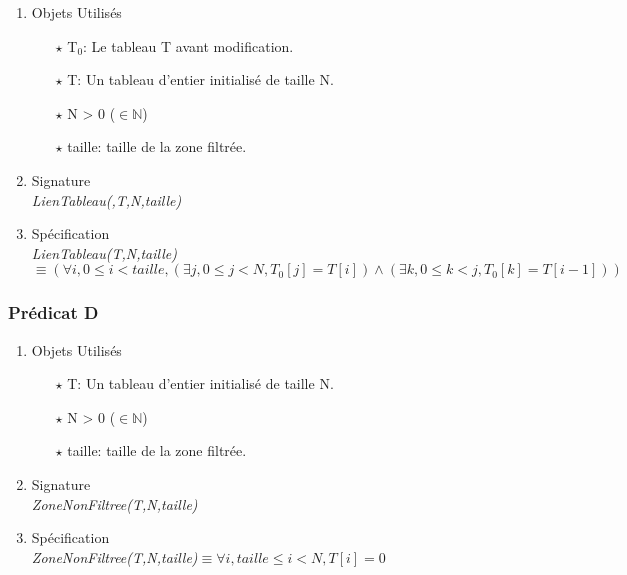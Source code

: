 \documentclass[a4paper, 11pt, oneside]{article}
\begin{document}
        \begin{enumerate}
            \item Objets Utilisés
                \begin{itemize}
                    \item[$\star$] T$_0$: Le tableau T avant modification.
                    \item[$\star$] T: Un tableau d'entier initialisé de taille N.
                    \item[$\star$] N > 0 ($\in \mathbb{N}$)
                    \item[$\star$] taille: taille de la zone filtrée. 
                \end{itemize}

            \item Signature \\
                \textit{LienTableau(,T,N,taille)}

            \item Spécification\\
                \textit{LienTableau(T,N,taille)}$\equiv (\forall i, 0\leq i < taille, (\exists j, 0\leq j < N, T_0[j] = T[i]) \wedge (\exists k, 0\leq k < j, T_0[k] = T[i-1]) )$
        \end{enumerate}

        \subsubsection{Prédicat D}

        \begin{enumerate}
            \item Objets Utilisés
                \begin{itemize}
                    \item[$\star$] T: Un tableau d'entier initialisé de taille N.
                    \item[$\star$] N > 0 ($\in \mathbb{N}$)
                    \item[$\star$] taille: taille de la zone filtrée. 
                \end{itemize}

            \item Signature \\
                \textit{ZoneNonFiltree(T,N,taille)}

            \item Spécification\\
                \textit{ZoneNonFiltree(T,N,taille)}$\equiv \forall i, taille    \leq  i < N, T[i]=0$
        \end{enumerate}
\end{document}
